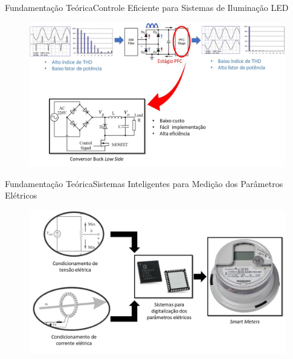 \begin{frame}{Fundamentação Teórica}{Controle Eficiente para Sistemas de Iluminação LED}
\vspace{-0.64cm}
\begin{figure}[htp]
	\centering
	\caption{}
	\includegraphics[width=0.97\linewidth]{img/pfc_.jpg}
    \hspace{5cm}
    \vspace{5cm}
\end{figure}
\end{frame}

\begin{frame}{Fundamentação Teórica}{Sistemas Inteligentes para Medição dos Parâmetros Elétricos}
\vspace{-0.64cm}
\begin{figure}[htp]
	\centering
	\caption{}
	\includegraphics[width=0.97\linewidth]{img/smeter.jpg}
    \hspace{5cm}
    \vspace{5cm}
\end{figure}
\end{frame}

